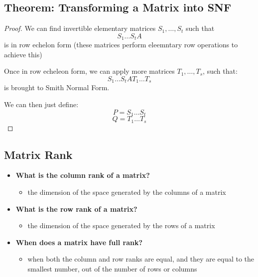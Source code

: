 \documentclass{exam}
\begin{document}
\subsection{Theorem: Transforming a Matrix into SNF}


\begin{proof}

We can find invertible elementary matrices $S_1, \ldots, S_t$ such that \[
S_1\ldots S_tA
\]
is in row echelon form (these matrices perform eleemntary row operations to achieve this)

\bigskip

Once in row echeleon form, we can apply more matrices $T_1, \ldots, T_s$, such that:
\[
S_1\ldots S_tAT_1\ldots T_s
\]
is brought to Smith Normal Form.

\bigskip

We can then just define:
\[
P = S_1\ldots S_t
\]
\[
Q = T_1\ldots T_s
\]

\end{proof}

\subsection{Matrix Rank}

\begin{itemize}
    \item \textbf{What is the column rank of a matrix?}
    \begin{itemize}
        \item the dimension of the space generated by the columns of a matrix
    \end{itemize}
    \item \textbf{What is the row rank of a matrix?}
    \begin{itemize}
        \item the dimension of the space generated by the rows of a matrix
    \end{itemize}
    \item \textbf{When does a matrix have full rank?}
    \begin{itemize}
        \item when both the column and row ranks are equal, and they are equal to the smallest number, out of the number of rows or columns
    \end{itemize}
\end{itemize}
\end{document}
